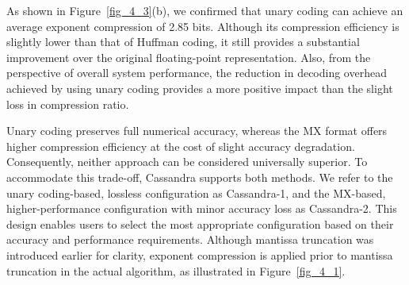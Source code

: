 
As shown in Figure~\ref{fig_4_3}(b), we confirmed that unary coding can achieve an average exponent compression of 2.85 bits. Although its compression efficiency is slightly lower than that of Huffman coding, it still provides a substantial improvement over the original floating-point representation. Also, from the perspective of overall system performance, the reduction in decoding overhead achieved by using unary coding provides a more positive impact than the slight loss in compression ratio.

Unary coding preserves full numerical accuracy, whereas the MX format offers higher compression efficiency at the cost of slight accuracy degradation. Consequently, neither approach can be considered universally superior. To accommodate this trade-off, Cassandra supports both methods. We refer to the unary coding-based, lossless configuration as Cassandra-1, and the MX-based, higher-performance configuration with minor accuracy loss as Cassandra-2. This design enables users to select the most appropriate configuration based on their accuracy and performance requirements. Although mantissa truncation was introduced earlier for clarity, exponent compression is applied prior to mantissa truncation in the actual algorithm, as illustrated in Figure~\ref{fig_4_1}.

 




